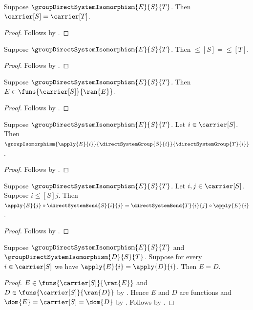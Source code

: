 \begin{proposition}\label{group_direct_system_isomorphism_carrier}
    Suppose $\groupDirectSystemIsomorphism{E}{S}{T}$.
    Then $\carrier[S]=\carrier[T]$.
\end{proposition}
\begin{proof}
    Follows by .
\end{proof}

\begin{proposition}\label{group_direct_system_isomorphism_order}
    Suppose $\groupDirectSystemIsomorphism{E}{S}{T}$.
    Then $\leq[S]=\leq[T]$.
\end{proposition}
\begin{proof}
    Follows by .
\end{proof}

\begin{proposition}\label{group_direct_system_isomorphism_family_type}
    Suppose $\groupDirectSystemIsomorphism{E}{S}{T}$.
    Then $E\in\funs{\carrier[S]}{\ran{E}}$.
\end{proposition}
\begin{proof}
    Follows by .
\end{proof}

\begin{proposition}\label{group_direct_system_isomorphism_component}
    Suppose $\groupDirectSystemIsomorphism{E}{S}{T}$.
    Let $i\in\carrier[S]$.
    Then $\groupIsomorphism{\apply{E}{i}}
        {\directSystemGroup{S}{i}}{\directSystemGroup{T}{i}}$.
\end{proposition}
\begin{proof}
    Follows by .
\end{proof}

\begin{proposition}\label{group_direct_system_isomorphism_square}
    Suppose $\groupDirectSystemIsomorphism{E}{S}{T}$.
    Let $i,j\in\carrier[S]$.
    Suppose $i\mathrel{\leq[S]}j$.
    Then $\apply{E}{j}\circ\directSystemBond{S}{i}{j}
        =\directSystemBond{T}{i}{j}\circ\apply{E}{i}$.
\end{proposition}
\begin{proof}
    Follows by .
\end{proof}

\begin{theorem}\label{group_direct_system_isomorphism_extensionality}
    Suppose $\groupDirectSystemIsomorphism{E}{S}{T}$ and
        $\groupDirectSystemIsomorphism{D}{S}{T}$.
    Suppose for every $i\in\carrier[S]$ we have
        $\apply{E}{i}=\apply{D}{i}$.
    Then $E=D$.
\end{theorem}
\begin{proof}
    $E\in\funs{\carrier[S]}{\ran{E}}$ and
        $D\in\funs{\carrier[S]}{\ran{D}}$ by
        .
    Hence $E$ and $D$ are functions and
        $\dom{E}=\carrier[S]=\dom{D}$ by
        .
    Follows by .
\end{proof}

